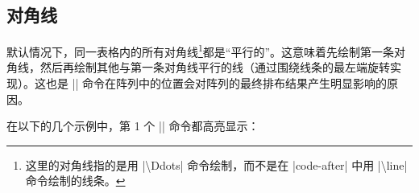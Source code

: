 \documentclass[dvipsnames]{article}%
\begin{document}
\subsection{对角线} 
\label{zm:对角线}

默认情况下，同一表格内的所有对角线\footnote{这里的对角线指的是用 |\textbackslash Ddots| 命令绘制，而不是在 |code-after| 中用 |\textbackslash line| 命令绘制的线条。}都是“平行的”。这意味着先绘制第一条对角线，然后再绘制其他与第一条对角线平行的线（通过围绕线条的最左端旋转实现）。这也是 |\Ddots| 命令在阵列中的位置会对阵列的最终排布结果产生明显影响的原因。

\medskip
在以下的几个示例中，第 1 个 |\Ddots| 命令都高亮显示：
\end{document}
